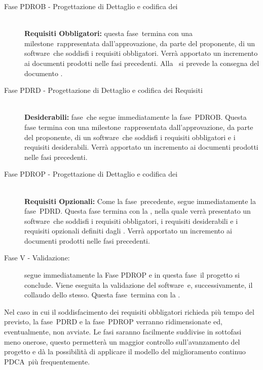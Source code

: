 \documentclass[../PianoProgetto.tex]{subfiles}
\begin{document}
\begin{description}
	\item[Fase PDROB - Progettazione di Dettaglio e codifica dei] \ \\
		\textbf{ Requisiti Obbligatori:}
		questa fase\g\ termina con una milestone\g\ rappresentata dall'approvazione, da parte del proponente, di un software\g\ che soddisfi i requisiti obbligatori.
		Verrà apportato un incremento ai documenti prodotti nelle fasi precedenti.
		Alla \revisionediprogettazione\ si prevede la consegna del documento  .
  
  
	\item[Fase PDRD - Progettazione di Dettaglio e codifica dei Requisiti] \ \\
		\textbf{Desiderabili:}
		fase\g\ che segue immediatamente la fase\g\ 
PDROB. Questa fase termina con una milestone\g\ rappresentata dall'approvazione, da parte del proponente, di un software\g\ che soddisfi i requisiti obbligatori e i requisiti desiderabili.
		Verrà apportato un incremento ai documenti prodotti nelle fasi precedenti.


	\item[Fase PDROP - Progettazione di Dettaglio e codifica dei ] \ \\
		\textbf{Requisiti Opzionali:}
		Come la fase\g\ precedente, segue immediatamente la fase\g\ PDRD. Questa fase termina con la \revisionediqualifica , nella quale verrà presentato un software\g\ che soddisfi i requisiti obbligatori, i requisiti desiderabili e i requisiti opzionali definiti dagli \analisti.
		Verrà apportato un incremento ai documenti prodotti nelle fasi precedenti.


	\item[Fase V - Validazione:]
	segue immediatamente la Fase PDROP e in questa fase\g\ il progetto si conclude. Viene eseguita la validazione del software\g\ e, successivamente, il collaudo dello stesso.
		Questa fase\g\ termina con la \revisionediaccettazione . 
		
	\end{description}
	
		Nel caso in cui il soddisfacimento dei requisiti obbligatori richieda più tempo del previsto, la fase\g\ PDRD e la fase\g\ 
PDROP verranno ridimensionate ed, eventualmente, non avviate.
		Le fasi saranno facilmente suddivise in sottofasi meno onerose, questo permetterà un maggior controllo sull'avanzamento del progetto e dà la possibilità di applicare il modello del miglioramento continuo PDCA\g\ più frequentemente.
\end{document}
